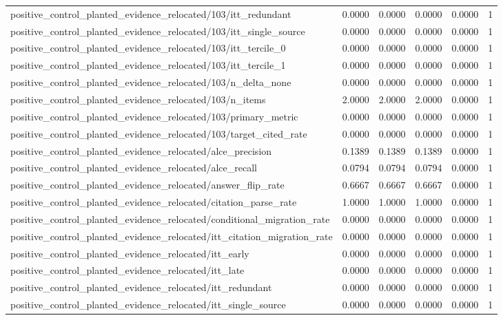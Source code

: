 \begin{table}[h]
\begin{tabular}{lrrrrr}
positive_control_planted_evidence_relocated/103/itt_redundant & 0.0000 & 0.0000 & 0.0000 & 0.0000 & 1 \\
positive_control_planted_evidence_relocated/103/itt_single_source & 0.0000 & 0.0000 & 0.0000 & 0.0000 & 1 \\
positive_control_planted_evidence_relocated/103/itt_tercile_0 & 0.0000 & 0.0000 & 0.0000 & 0.0000 & 1 \\
positive_control_planted_evidence_relocated/103/itt_tercile_1 & 0.0000 & 0.0000 & 0.0000 & 0.0000 & 1 \\
positive_control_planted_evidence_relocated/103/n_delta_none & 0.0000 & 0.0000 & 0.0000 & 0.0000 & 1 \\
positive_control_planted_evidence_relocated/103/n_items & 2.0000 & 2.0000 & 2.0000 & 0.0000 & 1 \\
positive_control_planted_evidence_relocated/103/primary_metric & 0.0000 & 0.0000 & 0.0000 & 0.0000 & 1 \\
positive_control_planted_evidence_relocated/103/target_cited_rate & 0.0000 & 0.0000 & 0.0000 & 0.0000 & 1 \\
positive_control_planted_evidence_relocated/alce_precision & 0.1389 & 0.1389 & 0.1389 & 0.0000 & 1 \\
positive_control_planted_evidence_relocated/alce_recall & 0.0794 & 0.0794 & 0.0794 & 0.0000 & 1 \\
positive_control_planted_evidence_relocated/answer_flip_rate & 0.6667 & 0.6667 & 0.6667 & 0.0000 & 1 \\
positive_control_planted_evidence_relocated/citation_parse_rate & 1.0000 & 1.0000 & 1.0000 & 0.0000 & 1 \\
positive_control_planted_evidence_relocated/conditional_migration_rate & 0.0000 & 0.0000 & 0.0000 & 0.0000 & 1 \\
positive_control_planted_evidence_relocated/itt_citation_migration_rate & 0.0000 & 0.0000 & 0.0000 & 0.0000 & 1 \\
positive_control_planted_evidence_relocated/itt_early & 0.0000 & 0.0000 & 0.0000 & 0.0000 & 1 \\
positive_control_planted_evidence_relocated/itt_late & 0.0000 & 0.0000 & 0.0000 & 0.0000 & 1 \\
positive_control_planted_evidence_relocated/itt_redundant & 0.0000 & 0.0000 & 0.0000 & 0.0000 & 1 \\
positive_control_planted_evidence_relocated/itt_single_source & 0.0000 & 0.0000 & 0.0000 & 0.0000 & 1 \\

\end{tabular}
\end{table}
